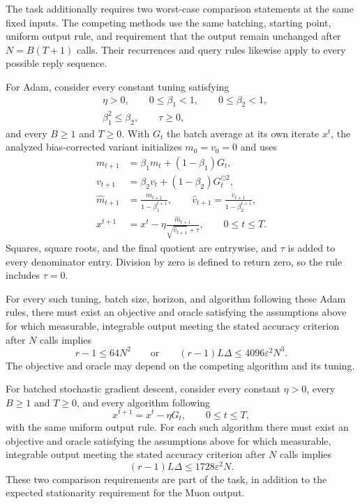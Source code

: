\documentclass[10pt]{article}
\theoremstyle{definition}
\begin{document}
The task additionally requires two worst-case comparison statements at the same fixed inputs. The competing methods use the same batching, starting point, uniform output rule, and requirement that the output remain unchanged after $N=B(T+1)$ calls. Their recurrences and query rules likewise apply to every possible reply sequence.

For Adam, consider every constant tuning satisfying
\[
\begin{aligned}
&\eta>0,\qquad 0\leq\beta_1<1,\qquad 0\leq\beta_2<1,\\
&\beta_1^2\leq\beta_2,\qquad \tau\geq0,
\end{aligned}
\]
and every $B\geq1$ and $T\geq0$. With $G_t$ the batch average at its own iterate $x^t$, the analyzed bias-corrected variant initializes $m_0=v_0=0$ and uses
\[
\begin{aligned}
m_{t+1}&=\beta_1m_t+(1-\beta_1)G_t,\\
v_{t+1}&=\beta_2v_t+(1-\beta_2)G_t^{\odot2},\\
\widehat m_{t+1}&=\frac{m_{t+1}}{1-\beta_1^{t+1}},\qquad
\widehat v_{t+1}=\frac{v_{t+1}}{1-\beta_2^{t+1}},\\
x^{t+1}&=x^t-\eta
\frac{\widehat m_{t+1}}{\sqrt{\widehat v_{t+1}}+\tau},
\qquad 0\leq t\leq T.
\end{aligned}
\]
Squares, square roots, and the final quotient are entrywise, and $\tau$ is added to every denominator entry. Division by zero is defined to return zero, so the rule includes $\tau=0$.

For every such tuning, batch size, horizon, and algorithm following these Adam rules, there must exist an objective and oracle satisfying the assumptions above for which measurable, integrable output meeting the stated accuracy criterion after $N$ calls implies
\[
r-1\leq64N^2
\qquad\text{or}\qquad
(r-1)L\Delta\leq4096\varepsilon^2N^3.
\]
The objective and oracle may depend on the competing algorithm and its tuning.

For batched stochastic gradient descent, consider every constant $\eta>0$, every $B\geq1$ and $T\geq0$, and every algorithm following
\[
x^{t+1}=x^t-\eta G_t,
\qquad 0\leq t\leq T,
\]
with the same uniform output rule. For each such algorithm there must exist an objective and oracle satisfying the assumptions above for which measurable, integrable output meeting the stated accuracy criterion after $N$ calls implies
\[
(r-1)L\Delta\leq1728\varepsilon^2N.
\]
These two comparison requirements are part of the task, in addition to the expected stationarity requirement for the Muon output.
\end{document}
